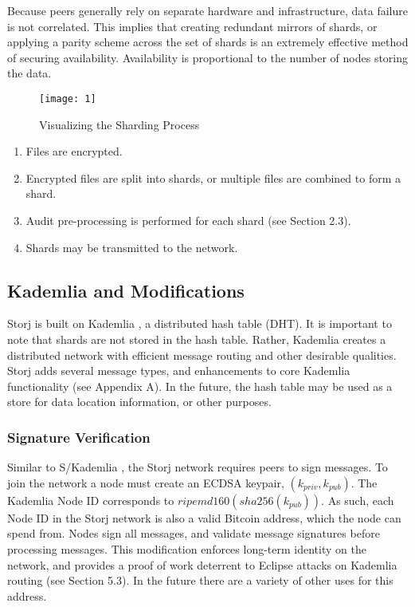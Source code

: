 \documentclass[a4paper,10pt]{article}
\begin{document}
Because peers generally rely on separate hardware and infrastructure, data
failure is not correlated. This implies that creating redundant mirrors of
shards, or applying a parity scheme across the set of shards is an extremely
effective method of securing availability. Availability is proportional to the
number of nodes storing the data.

\begin{figure}[hbt]
\centering
\texttt{[image: 1]}
\caption{Visualizing the Sharding Process}
\end{figure}

\begin{enumerate}
\item Files are encrypted.
\item Encrypted files are split into shards, or multiple files are combined to
form a shard.
\item Audit pre-processing is performed for each shard (see Section 2.3).
\item Shards may be transmitted to the network.
\end{enumerate}

\subsection{Kademlia and Modifications}
Storj is built on Kademlia \cite{2}, a distributed hash table (DHT). It is
important to note that shards are not stored in the hash table. Rather, Kademlia
creates a distributed network with efficient message routing and other desirable
qualities. Storj adds several message types, and enhancements to core Kademlia
functionality (see Appendix A). In the future, the hash table may be used as a
store for data location information, or other purposes.

\subsubsection{Signature Verification}
Similar to S/Kademlia \cite{3}, the Storj network requires peers to sign
messages. To join the network a node must create an ECDSA keypair, $ (k_{priv},
k_{pub}) $. The Kademlia Node ID corresponds to $ ripemd160(sha256(k_{pub})) $.
As such, each Node ID in the Storj network is also a valid Bitcoin address,
which the node can spend from. Nodes sign all messages, and validate message
signatures before processing messages. This modification enforces long-term
identity on the network, and provides a proof of work deterrent to Eclipse
attacks on Kademlia routing (see Section 5.3). In the future there are a variety
of other uses for this address.
\end{document}
